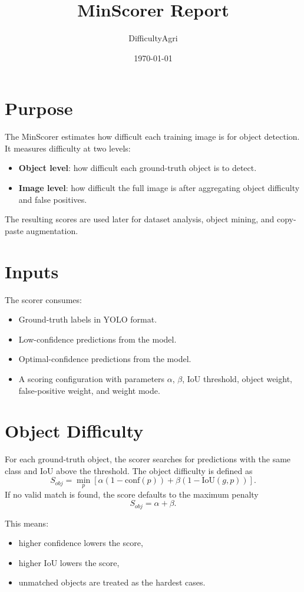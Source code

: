 \documentclass[11pt]{article}
\title{MinScorer Report}
\author{DifficultyAgri}
\date{\today}
\begin{document}
\maketitle

\section{Purpose}
The MinScorer estimates how difficult each training image is for object detection. It measures difficulty at two levels:
\begin{itemize}
	\item \textbf{Object level}: how difficult each ground-truth object is to detect.
	\item \textbf{Image level}: how difficult the full image is after aggregating object difficulty and false positives.
\end{itemize}
The resulting scores are used later for dataset analysis, object mining, and copy-paste augmentation.

\section{Inputs}
The scorer consumes:
\begin{itemize}
	\item Ground-truth labels in YOLO format.
	\item Low-confidence predictions from the model.
	\item Optimal-confidence predictions from the model.
	\item A scoring configuration with parameters \(\alpha\), \(\beta\), IoU threshold, object weight, false-positive weight, and weight mode.
\end{itemize}

\section{Object Difficulty}
For each ground-truth object, the scorer searches for predictions with the same class and IoU above the threshold. The object difficulty is defined as
\[
S_{obj} = \min_{p} \left[ \alpha(1-\mathrm{conf}(p)) + \beta(1-\mathrm{IoU}(g,p)) \right].
\]
If no valid match is found, the score defaults to the maximum penalty
\[
S_{obj} = \alpha + \beta.
\]

This means:
\begin{itemize}
	\item higher confidence lowers the score,
	\item higher IoU lowers the score,
	\item unmatched objects are treated as the hardest cases.
\end{itemize}
\end{document}
